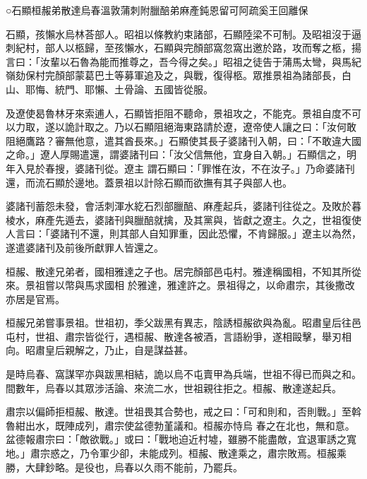 
\begin{pinyinscope}

 ○石顯桓赧弟散達烏春溫敦蒲刺附臘醅弟麻產鈍恩留可阿疏奚王回離保



 石顯，孩懶水烏林荅部人。昭祖以條教約束諸部，石顯陸梁不可制。及昭祖沒于逼刺紀村，部人以柩歸，至孩懶水，石顯與完顏部窩忽窩出邀於路，攻而奪之柩，揚
 言曰：「汝輩以石魯為能而推尊之，吾今得之矣。」昭祖之徒告于蒲馬太彎，與馬紀嶺劾保村完顏部蒙葛巴土等募軍追及之，與戰，復得柩。眾推景祖為諸部長，白山、耶悔、統門、耶懶、土骨論、五國皆從服。



 及遼使曷魯林牙來索逋人，石顯皆拒阻不聽命，景祖攻之，不能克。景祖自度不可以力取，遂以詭計取之。乃以石顯阻絕海東路請於遼，遼帝使人讓之曰：「汝何敢阻絕鷹路？審無他意，遣其酋長來。」石顯使其長子婆諸刊入朝，曰：「不敢違大國之命。」遼人厚賜遣還，謂婆諸刊曰：「汝父信無他，宜身自入朝。」石顯信之，明年入見於春搜，婆諸刊從。遼主
 謂石顯曰：「罪惟在汝，不在汝子。」乃命婆諸刊還，而流石顯於邊地。蓋景祖以計除石顯而欲撫有其子與部人也。



 婆諸刊蓄怨未發，會活刺渾水紇石烈部臘醅、麻產起兵，婆諸刊往從之。及敗於暮棱水，麻產先遁去，婆諸刊與臘醅就擒，及其黨與，皆獻之遼主。久之，世祖復使人言曰：「婆諸刊不還，則其部人自知罪重，因此恐懼，不肯歸服。」遼主以為然，遂遣婆諸刊及前後所獻罪人皆還之。



 桓赧、散達兄弟者，國相雅達之子也。居完顏部邑屯村。雅達稱國相，不知其所從來。景祖嘗以幣與馬求國相
 於雅達，雅達許之。景祖得之，以命肅宗，其後撒改亦居是官焉。



 桓赧兄弟嘗事景祖。世祖初，季父跋黑有異志，陰誘桓赧欲與為亂。昭肅皇后往邑屯村，世祖、肅宗皆從行，遇桓赧、散達各被酒，言語紛爭，遂相毆擊，舉刃相向。昭肅皇后親解之，乃止，自是謀益甚。



 是時烏春、窩謀罕亦與跋黑相結，詭以烏不屯賣甲為兵端，世祖不得已而與之和。間數年，烏春以其眾涉活論、來流二水，世祖親往拒之。桓赧、散達遂起兵。



 肅宗以偏師拒桓赧、散達。世祖畏其合勢也，戒之曰：「可和則和，否則戰。」至斡魯紺出水，既陣成列，肅宗使盆德勃堇議和。桓赧亦恃烏
 春之在北也，無和意。盆德報肅宗曰：「敵欲戰。」或曰：「戰地迫近村墟，雖勝不能盡敵，宜退軍誘之寬地。」肅宗惑之，乃令軍少卻，未能成列。桓赧、散達乘之，肅宗敗焉。桓赧乘勝，大肆鈔略。是役也，烏春以久雨不能前，乃罷兵。




\end{pinyinscope}
